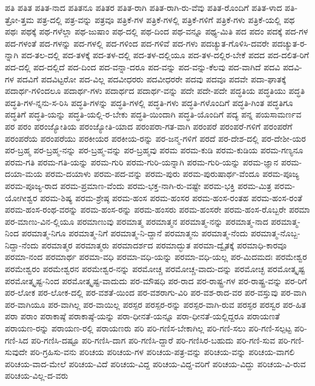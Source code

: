 {ಪತಿ
ಪತಿತ
ಪತಿತ-ನಾದ
ಪತಿತನೂ
ಪತಿತರ
ಪತಿತ-ರಾಗಿ
ಪತಿತ-ರಾಗಿ-ರು-ವೆವು
ಪತಿತ-ರೊಂದಿಗೆ
ಪತಿತ-ಳಾದ
ಪತಿ-ತ್ರೋ-ತ್ತಮ
ಪತ್ರ-ದಲ್ಲಿ
ಪತ್ರ-ವನ್ನು
ಪತ್ರವೂ
ಪತ್ರಿಕೆ-ಗಳ
ಪತ್ರಿಕೆ-ಗಳಲ್ಲಿ
ಪತ್ರಿಕೆ-ಗಳಿಗೆ
ಪತ್ರಿಕೆ-ಗಳು
ಪತ್ರಿಕೆ-ಯಲ್ಲಿ
ಪಥ
ಪಥಃ
ಪಥಕ್ಕೆ
ಪಥ-ಗಳೆಲ್ಲಾ
ಪಥ-ಜುಷಾಂ
ಪಥ-ದಲ್ಲಿ
ಪಥ-ದಿಂದ
ಪಥ-ವನ್ನೂ
ಪಥ್ಯ-ಮಿತಿ
ಪದ
ಪದಂ
ಪದಕ್ಕೆ
ಪದ-ಗಳ
ಪದ-ಗಳಂತೆ
ಪದ-ಗಳನ್ನು
ಪದ-ಗಳಲ್ಲಿ
ಪದ-ಗಳಿಂದ
ಪದ-ಗಳಿವೆ
ಪದ-ಗಳು
ಪದಚ್ಯುತ-ಗೊಳಿಸಿ-ದವರೇ
ಪದಚ್ಯುತ-ರ-ನ್ನಾಗಿ
ಪದ-ತಲ-ದಲ್ಲಿ
ಪದ-ತಳಕ್ಕೆ
ಪದ-ತಳ-ದಲ್ಲಿ
ಪದ-ತಳ-ದಲ್ಲಿಯೂ
ಪದ-ತಳ-ದಲ್ಲಿರ-ಬೇಕೆ
ಪದದ
ಪದ-ದಲಿತ-ರಿಗೆ
ಪದ-ದಲ್ಲಿ
ಪದ-ದಲ್ಲಿದೆ
ಪದ-ದಿಂದ
ಪದ-ವನ್ನಾ-ದರೂ
ಪದ-ವನ್ನು
ಪದ-ವನ್ನು-ಕೆಲವು
ಪದ-ವಾಗಿದೆ
ಪದವಿ
ಪದವಿ-ಗಳ
ಪದವಿಗೆ
ಪದವಿಟ್ಟರೋ
ಪದ-ವಿಲ್ಲ
ಪದವೀಧರರು
ಪದವೀಧರರೇ
ಪದವು
ಪದವೂ
ಪದವೇ
ಪದಾ-ಘಾತಕ್ಕೆ
ಪದಾರ್ಥ-ಗಳಿಂದಲೂ
ಪದಾರ್ಥ-ಗಳು
ಪದಾರ್ಥದ
ಪದಾರ್ಥ-ವನ್ನು
ಪದೇ
ಪದೇ-ಪದೇ
ಪದ್ಧತಿಯ
ಪದ್ಧತಿಯು
ಪದ್ಧತಿ
ಪದ್ಧತಿ-ಗಳ-ನ್ನನು-ಸ-ರಿಸಿ
ಪದ್ಧತಿ-ಗಳನ್ನು
ಪದ್ಧತಿ-ಗಳಲ್ಲಿ
ಪದ್ಧತಿ-ಗಳು
ಪದ್ಧತಿ-ಗಳೊಂದಿಗೆ
ಪದ್ಧತಿ-ಗಿಂತ
ಪದ್ಧತಿಗೂ
ಪದ್ಧತಿಗೆ
ಪದ್ಧತಿ-ಯನ್ನು
ಪದ್ಧತಿ-ಯಲ್ಲಿ-ರ-ಬೇಕು
ಪದ್ಧತಿ-ಯಿಂದಾಗಿ
ಪದ್ಧತಿ-ಯೊಂದಿಗೆ
ಪದ್ಯ
ಪನ್ನ
ಪಯಸಾಮರ್ಣವ
ಪರ
ಪರಂ
ಪರಂಜ್ಯೋತಿಯ
ಪರಂಜ್ಯೋತಿ-ಯಾದ
ಪರಂಪರಾ-ಗತ-ವಾಗಿ
ಪರಂಪರೆ
ಪರಂಪರೆ-ಗಳಿಗೆ
ಪರಂಪರೆಗೆ
ಪರಂಪರೆಯ
ಪರಂಪರೆಯು
ಪರಕೀಯರ
ಪರಕೀಯ-ರನ್ನು
ಪರ-ಜನ್ಮ-ಗಳಿಗೆ
ಪರದೆ
ಪರ-ದೇಶ-ದಲ್ಲಿ
ಪರ-ದೇಶೀ-ಯರ
ಪರ-ಬ್ರಹ್ಮ
ಪರ-ಬ್ರಹ್ಮ-ನನ್ನು
ಪರ-ಬ್ರಹ್ಮ-ವನ್ನು
ಪರ-ಬ್ರಹ್ಮವು
ಪರಮ
ಪರಮ-ಕುಡಿ
ಪರಮ-ಕುಡಿಯ
ಪರಮ-ಗಣ್ಯನೂ
ಪರಮ-ಗತಿ
ಪರಮ-ಗತಿ-ಯನ್ನು
ಪರಮ-ಗುರಿ
ಪರಮ-ಗುರಿ-ಯನ್ನಾಗಿ
ಪರಮ-ಗುರಿ-ಯನ್ನು
ಪರಮ-ಜ್ಞಾನ
ಪರಮ-ದಯಾ-ಮಯ
ಪರಮ-ದಯಾಳು
ಪರಮ-ಪದ-ವನ್ನು
ಪರಮ-ಪುರು
ಪರಮ-ಪುರುಷಾರ್ಥ-ವೆಂದೂ
ಪರಮ-ಪೂಜ್ಯ
ಪರಮ-ಪೂಜ್ಯ-ರಾದ
ಪರಮ-ಪ್ರಮಾಣ-ವೆಂದು
ಪರಮ-ಭಕ್ತ-ನಾಗಿ-ರು-ವಷ್ಟೇ
ಪರಮ-ಭಕ್ತಿ
ಪರಮ-ಮಿತ್ರ
ಪರಮ-ಯೋಗೀಶ್ವರ
ಪರಮ-ಶಿಷ್ಯ
ಪರಮ-ಶ್ರೇಷ್ಠ
ಪರಮ-ಹಂಸ
ಪರಮ-ಹಂಸರ
ಪರಮ-ಹಂಸ-ರಂತಹ
ಪರಮ-ಹಂಸ-ರಂತೆ
ಪರಮ-ಹಂಸ-ರಂಥ-ವರನ್ನು
ಪರಮ-ಹಂಸ-ರನ್ನು
ಪರಮ-ಹಂಸರು
ಪರಮ-ಹಂಸರೇ
ಪರಮ-ಹಂಸ-ರೊಬ್ಬರೇ
ಪರಮಾ
ಪರ-ಮಾಣು-ವಿನ-ಲ್ಲಿಯೂ
ಪರಮಾಣುವು
ಪರಮಾತ್ಮ
ಪರಮಾತ್ಮನ
ಪರಮಾತ್ಮ-ನನ್ನು
ಪರಮಾತ್ಮ-ನಾದ
ಪರಮಾತ್ಮ-ನಿಂದ
ಪರಮಾತ್ಮ-ನಿಗೂ
ಪರಮಾತ್ಮ-ನಿಗೆ
ಪರಮಾತ್ಮ-ನಿ-ದ್ದಾನೆ
ಪರಮಾತ್ಮನು
ಪರಮಾತ್ಮ-ನೆಂದು
ಪರಮಾತ್ಮ-ನೊಬ್ಬ-ನಿದ್ದಾ-ನೆಂದು
ಪರಮಾತ್ಮರ
ಪರಮಾತ್ಮರು
ಪರಮಾದರ್ಶದ
ಪರಮಾದ್ಭುತ
ಪರಮಾ-ದ್ವೈತಕ್ಕೆ
ಪರಮಾಧಿ-ಕಾರವೂ
ಪರಮಾ-ನಂದ
ಪರಮಾರ್ಥ
ಪರಮಾ-ವಧಿ
ಪರಮಾ-ವಧಿ-ಯನ್ನು
ಪರಮಾ-ವಧಿ-ಯಲ್ಲ
ಪರ-ಮಿದಮದಃ
ಪರಮೇಶ್ವರ
ಪರಮೇಶ್ವರಂ
ಪರಮೇಶ್ವರನ
ಪರಮೇಶ್ವರ-ನನ್ನು
ಪರಮೋಚ್ಚ
ಪರಮೋಚ್ಚ-ವಾದು-ದನ್ನು
ಪರಮೋಚ್ಛ
ಪರಮೋತ್ಕೃಷ್ಟ
ಪರಮೋತ್ಕೃಷ್ಟ-ನಿಂದ
ಪರಮೋತ್ಕೃಷ್ಟ-ವಾದುದು
ಪರ-ಮೌಷಧಿ
ಪರ-ರಾದ
ಪರ-ರಾಷ್ಟ್ರ-ಗಳ
ಪರ-ರಾಷ್ಟ್ರ-ವನ್ನು
ಪರ-ರಿಗೆ
ಪರ-ಲೋಕ
ಪರ-ಲೋಕ-ದಲ್ಲಿ
ಪರ-ವಶತೆ-ಯಿಂದ
ಪರ-ವಶರಾಗು-ವಿರಿ
ಪರ-ವಶ-ರಾದ-ವರ
ಪರ-ವಸ್ತುವು
ಪರ-ವಾಗಿ
ಪರ-ವಾಗಿಯೂ
ಪರ-ವಾಗಿಲ್ಲ
ಪರ-ವಾಯಿಲ್ಲ
ಪರಸ್ಪರ
ಪರಸ್ಪರ-ರನ್ನು
ಪರಸ್ಪರ-ವಾಗಿ-ರುವ
ಪರಸ್ಫರ
ಪರಸ್ವರ
ಪರ-ಹಿತ
ಪರಾ
ಪರಾಂ
ಪರಾಕಾಷ್ಠೆ
ಪರಾಕಾಷ್ಠೆ-ಯನ್ನು
ಪರಾ-ಧೀನತೆ-ಯನ್ನೂ
ಪರಾ-ಧೀನತೆ-ಯಲ್ಲಿದ್ದರೂ
ಪರಾಯಣತೆ
ಪರಾಯಣ-ರನ್ನು
ಪರಾಯಣ-ರಲ್ಲಿ
ಪರಾಯಣರು
ಪರಿ
ಪರಿ-ಗಣಿಸ-ಬೇಕಾಗಿಲ್ಲ
ಪರಿ-ಗಣಿ-ಸಲು
ಪರಿ-ಗಣಿ-ಸಲ್ಪಟ್ಟ
ಪರಿ-ಗಣಿ-ಸಿದ
ಪರಿ-ಗಣಿಸಿ-ದಷ್ಟೂ
ಪರಿ-ಗಣಿಸಿ-ದಾಗ
ಪರಿ-ಗಣಿಸಿ-ದ್ದಾರೆ
ಪರಿ-ಗಣಿಸಿರ-ಬಹುದು
ಪರಿ-ಗಣಿ-ಸುವ
ಪರಿ-ಗಣಿ-ಸುವುದೇ
ಪರಿ-ಗ್ರಹಿಸು-ವನು
ಪರಿಚಯ
ಪರಿಚಯ-ಗಳ
ಪರಿಚಯ-ಪತ್ರ-ವನ್ನು
ಪರಿಚಯ-ವನ್ನು
ಪರಿಚಯ-ವಾಗಲಿ
ಪರಿಚಯ-ವಾದ-ಮೇಲೆ
ಪರಿಚಯ-ವಿದೆ
ಪರಿಚಯ-ವಿದ್ದ
ಪರಿಚಯ-ವಿದ್ದ-ವರಿಗೆ
ಪರಿಚಯ-ವಿದ್ದು
ಪರಿಚಯ-ವಿ-ರುವ
ಪರಿಚಯ-ವಿಲ್ಲ-ದ-ವರು
}
